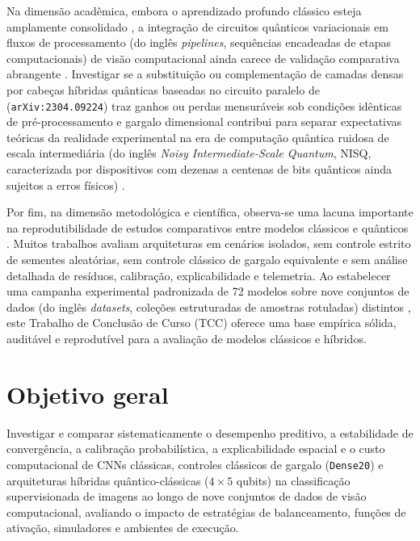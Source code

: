 \documentclass[
    12pt,
    openright,
    oneside,
    a4paper,
    english,
    brazil
]{abntex2}
\begin{document}
Na dimensão acadêmica, embora o aprendizado profundo clássico esteja amplamente consolidado \cite{LeCun2015,goodfellow2016deep}, a integração de circuitos quânticos variacionais em fluxos de processamento (do inglês \textit{pipelines}, sequências encadeadas de etapas computacionais) de visão computacional ainda carece de validação comparativa abrangente \cite{Wazlawick2020,cerezo2021variational,long2025qcqcnn}. Investigar se a substituição ou complementação de camadas densas por cabeças híbridas quânticas baseadas no circuito paralelo de  (\texttt{arXiv:2304.09224}) traz ganhos ou perdas mensuráveis sob condições idênticas de pré-processamento e gargalo dimensional contribui para separar expectativas teóricas da realidade experimental na era de computação quântica ruidosa de escala intermediária (do inglês \textit{Noisy Intermediate-Scale Quantum}, NISQ, caracterizada por dispositivos com dezenas a centenas de bits quânticos ainda sujeitos a erros físicos) \cite{preskill2018nisq}.

Por fim, na dimensão metodológica e científica, observa-se uma lacuna importante na reprodutibilidade de estudos comparativos entre modelos clássicos e quânticos \cite{Wazlawick2020}. Muitos trabalhos avaliam arquiteturas em cenários isolados, sem controle estrito de sementes aleatórias, sem controle clássico de gargalo equivalente e sem análise detalhada de resíduos, calibração, explicabilidade e telemetria. Ao estabelecer uma campanha experimental padronizada de 72 modelos sobre nove conjuntos de dados (do inglês \textit{datasets}, coleções estruturadas de amostras rotuladas) distintos \cite{Wazlawick2020}, este Trabalho de Conclusão de Curso (TCC) oferece uma base empírica sólida, auditável e reprodutível para a avaliação de modelos clássicos e híbridos.

\section{Objetivo geral}

Investigar e comparar sistematicamente o desempenho preditivo, a estabilidade de convergência, a calibração probabilística, a explicabilidade espacial e o custo computacional de CNNs clássicas, controles clássicos de gargalo (\texttt{Dense20}) e arquiteturas híbridas quântico-clássicas (\(4 \times 5\) qubits) na classificação supervisionada de imagens ao longo de nove conjuntos de dados de visão computacional, avaliando o impacto de estratégias de balanceamento, funções de ativação, simuladores e ambientes de execução.
\end{document}
